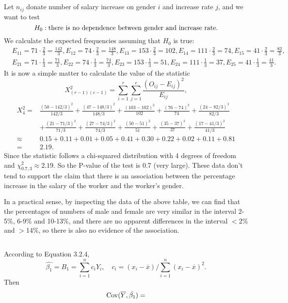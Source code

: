 \documentclass[11pt,a4paper]{article}
\begin{document}
\subsection{}
Let $n_{ij}$ donate number of salary increase on gender $i$ and increase rate $j$, and we want to test
$$H_0:{\rm there\ is\ no\ dependence\ between\ gender\ and\ increase\ rate }.$$
We calculate the expected frequencies assuming that $H_0$ is true:
\begin{align*}
&E_{11}=71\cdot\frac{2}{3}=\frac{142}{3},E_{12}=74\cdot\frac{2}{3}=\frac{148}{3},E_{13}=153\cdot\frac{2}{3}=102,E_{14}=111\cdot\frac{2}{3}=74,E_{15}=41\cdot\frac{2}{3}=\frac{82}{3},\\
&E_{21}=71\cdot\frac{1}{3}=\frac{71}{3},E_{22}=74\cdot\frac{1}{3}=\frac{74}{3},E_{23}=153\cdot\frac{1}{3}=51,E_{24}=111\cdot\frac{1}{3}=37,E_{25}=41\cdot\frac{1}{3}=\frac{41}{3}.
\end{align*}
It is now a simple matter to calculate the value of the statistic
$$X^2_{(r-1)(c-1)}=\sum_{i=1}^r\sum_{j=1}^c\frac{(O_{ij}-E_{ij})^2}{E_{ij}},$$
\begin{align*}
X_4^2=&\frac{(50-142/3)^2}{142/3}+\frac{(47-148/3)^2}{148/3}+\frac{(103-102)^2}{102}+\frac{(76-74)^2}{74}+\frac{(24-82/3)^2}{82/3}\\
&+\frac{(21-71/3)^2}{71/3}+\frac{(27-74/3)^2}{74/3}+\frac{(50-51)^2}{51}+\frac{(35-37)^2}{37}+\frac{(17-41/3)^2}{41/3}\\
\approx &0.15+0.11+0.01+0.05+0.41+0.30+0.22+0.02+0.11+0.81\\
=&2.19.
\end{align*}
Since the statistic follows a chi-squared distribution with 4 degrees of
freedom and $\chi^2_{0.7,3}\approx2.19$. So the P-value of the test is 0.7 (very large). These data don't tend to support the claim that there is an association between the percentage increase in the
salary of the worker and the worker’s gender. \medskip

In a practical sense, by inspecting the data of the above table, we can find that the percentages of numbers of male and female are very similar in the interval 2-5\%, 6-9\% and 10-13\%, and there are no apparent differences in the interval $<$2\% and $>$14\%, so there is also no evidence of the association.

\subsection{}
According to Equation 3.2.4,
$$\hat{\beta_1}=B_1=\sum_{i=1}^nc_iY_i,\quad c_i=(x_i-\overline{x})/\sum_{i=1}^n(x_i-\overline{x})^2.$$
Then
$${\rm Cov}(\overline{Y},\hat{\beta_1})=$$
\end{document}
